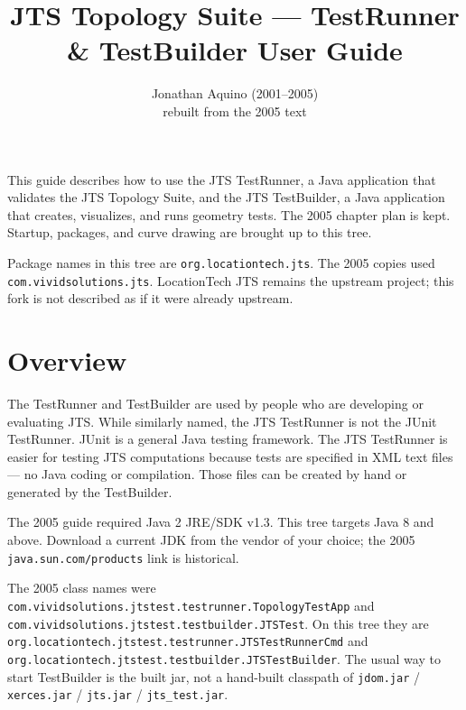 \documentclass[11pt]{article}
\title{JTS Topology Suite --- TestRunner \& TestBuilder User Guide}
\author{Jonathan Aquino (2001--2005) \\ rebuilt from the 2005 text}
\date{}
\begin{document}

\noindent
This guide describes how to use the JTS TestRunner, a Java application
that validates the JTS Topology Suite, and the JTS TestBuilder, a Java
application that creates, visualizes, and runs geometry tests. The 2005
chapter plan is kept. Startup, packages, and curve drawing are brought
up to this tree.

Package names in this tree are \texttt{org.locationtech.jts}. The 2005
copies used \texttt{com.vividsolutions.jts}. LocationTech JTS remains
the upstream project; this fork is not described as if it were already
upstream.

\clearpage
{}

\tableofcontents
\clearpage

\section{Overview}
The TestRunner and TestBuilder are used by people who are developing
or evaluating JTS. While similarly named, the JTS TestRunner is not
the JUnit TestRunner. JUnit is a general Java testing framework. The
JTS TestRunner is easier for testing JTS computations because tests
are specified in XML text files --- no Java coding or compilation.
Those files can be created by hand or generated by the TestBuilder.

The 2005 guide required Java 2 JRE/SDK v1.3. This tree targets Java 8
and above. Download a current JDK from the vendor of your choice; the
2005 \texttt{java.sun.com/products} link is historical.

The 2005 class names were
\texttt{com.vividsolutions.jtstest.testrunner.TopologyTestApp} and
\texttt{com.vividsolutions.jtstest.testbuilder.JTSTest}. On this tree
they are
\texttt{org.locationtech.jtstest.testrunner.JTSTestRunnerCmd} and
\texttt{org.locationtech.jtstest.testbuilder.JTSTestBuilder}. The
usual way to start TestBuilder is the built jar, not a hand-built
classpath of \texttt{jdom.jar} / \texttt{xerces.jar} / \texttt{jts.jar}
/ \texttt{jts\_test.jar}.
\end{document}
